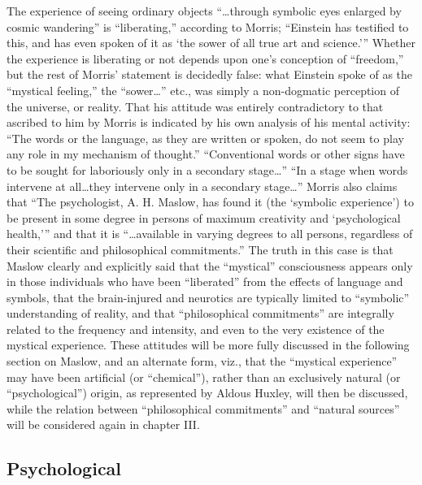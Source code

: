 The experience of seeing ordinary objects \enquote{\dots through
symbolic eyes enlarged by cosmic wandering} is \enquote{liberating,}
according to Morris; \enquote{Einstein has testified to this, and has
even spoken of it as \enquote*{the sower of all true art and science.}}
Whether the experience is liberating or not depends upon one's
conception of \enquote{freedom,} but the rest of Morris' statement is
decidedly false: what Einstein spoke of as the \enquote{mystical feeling,} the
\enquote{sower\dots} etc., was simply a non-dogmatic perception of the universe, or reality.
That his attitude was entirely contradictory to that ascribed to him by Morris is indicated
by his own analysis of his mental activity:\supercite{ghiselin:creative-process}
\enquote{The words or the language, as they are written or spoken,
do not seem to play any role in my mechanism of thought.}
\enquote{Conventional words or other signs have to be sought for laboriously only
in a secondary stage\dots} \enquote{In a stage when words intervene at all\dots they intervene only in a secondary stage\dots}\supercite{ghiselin:creative-process}
Morris also claims that \enquote{The psychologist, A. H. Maslow,
has found it (the \enquote*{symbolic experience}) to be present in some degree
in persons of maximum creativity and \enquote*{psychological health,}} and that it is \enquote{\dots available in varying degrees
to all persons, regardless of their scientific and philosophical commitments.}\supercite{hayakawa:language-meaning-maturity}
The truth in this case is that Maslow clearly and explicitly said that the \enquote{mystical} consciousness
appears only in those individuals who have been \enquote{liberated} from the effects of
language and symbols, that the brain-injured and neurotics are typically limited
to \enquote{symbolic} understanding of reality, and that \enquote{philosophical commitments}
are integrally related to the frequency and intensity, and even to the very existence
of the mystical experience. These attitudes will be more fully discussed in the
following section on Maslow, and an alternate form, viz.,
that the \enquote{mystical experience} may have been artificial (or \enquote{chemical}), rather than
an exclusively natural (or \enquote{psychological}) origin, as represented by Aldous Huxley, will then
be discussed, while the relation between \enquote{philosophical commitments} and \enquote{natural sources}
will be considered again in chapter III.

\label{self:29}

\subsection{Psychological}

